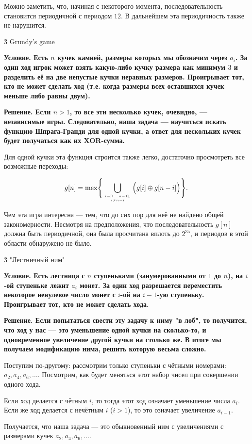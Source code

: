 Можно заметить, что, начиная с некоторого момента, последовательность становится периодичной с периодом $12$. В дальнейшем эта периодичность также не нарушится.


\h3{ Grundy's game }

\bf{Условие}. Есть $n$ кучек камней, размеры которых мы обозначим через $a_i$. За один ход игрок может взять какую-либо кучку размера как минимум $3$ и разделить её на две непустые кучки неравных размеров. Проигрывает тот, кто не может сделать ход (т.е. когда размеры всех оставшихся кучек меньше либо равны двум).

\bf{Решение}. Если $n > 1$, то все эти несколько кучек, очевидно, --- независимые игры. Следовательно, наша задача --- научиться искать функцию Шпрага-Гранди для одной кучки, а ответ для нескольких кучек будет получаться как их XOR-сумма.

Для одной кучки эта функция строится также легко, достаточно просмотреть все возможные переходы:

$$ g[n] = {\rm mex} \Bigg\{ \bigcup_{i=[1 \ldots n-1], \atop i \ne n-i } \Big( g[i] \oplus g[n-i] \Big) \Bigg\}. $$

Чем эта игра интересна --- тем, что до сих пор для неё не найдено общей закономерности. Несмотря на предположения, что последовательность $g[n]$ должна быть периодичной, она была просчитана вплоть до $2^{35}$, и периодов в этой области обнаружено не было.


\h3{ "Лестничный ним" }

\bf{Условие}. Есть лестница с $n$ ступеньками (занумерованными от $1$ до $n$), на $i$-ой ступеньке лежит $a_i$ монет. За один ход разрешается переместить некоторое ненулевое число монет с $i$-ой на $i-1$-ую ступеньку. Проигрывает тот, кто не может сделать хода.

\bf{Решение}. Если попытаться свести эту задачу к ниму "в лоб", то получится, что ход у нас --- это уменьшение одной кучки на сколько-то, и одновременное увеличение другой кучки на столько же. В итоге мы получаем модификацию нима, решить которую весьма сложно.

Поступим по-другому: рассмотрим только ступеньки с чётными номерами: $a_2, a_4, a_6, \ldots$. Посмотрим, как будет меняться этот набор чисел при совершении одного хода.

Если ход делается с чётным $i$, то тогда этот ход означает уменьшение числа $a_i$. Если же ход делается с нечётным $i$ ($i > 1$), то это означает увеличение $a_{i-1}$.

Получается, что наша задача --- это обыкновенный ним с увеличениями с размерами кучек $a_2, a_4, a_6, \ldots$.

